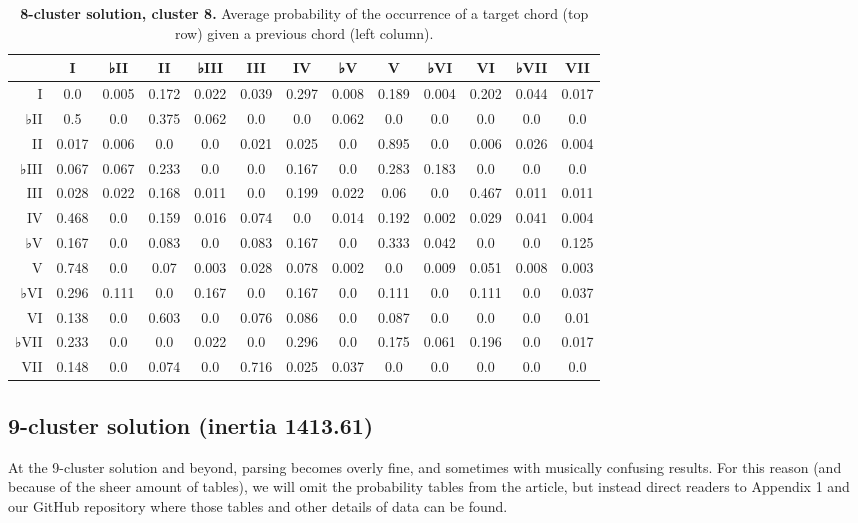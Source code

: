 \begin{table}[htbp]
\begin{minipage}{\linewidth}
\setlength{\tymax}{0.5\linewidth}
\centering
\small
\caption{\textbf{8-cluster solution, cluster 8.} Average probability of the occurrence of a target chord (top row) given a previous chord (left column).}
\label{8-clustersolutioncluster8.averageprobabilityoftheoccurrenceofatargetchordtoprowgivenapreviouschordleftcolumn.}
\begin{tabulary}{\textwidth}{@{}RCCCCCCCCCCCC@{}} \toprule
&I&♭II&II&♭III&III&IV&♭V&V&♭VI&VI&♭VII&VII\\
\midrule
I&0.0&0.005&0.172&0.022&0.039&0.297&0.008&0.189&0.004&0.202&0.044&0.017\\
♭II&0.5&0.0&0.375&0.062&0.0&0.0&0.062&0.0&0.0&0.0&0.0&0.0\\
II&0.017&0.006&0.0&0.0&0.021&0.025&0.0&0.895&0.0&0.006&0.026&0.004\\
♭III&0.067&0.067&0.233&0.0&0.0&0.167&0.0&0.283&0.183&0.0&0.0&0.0\\
III&0.028&0.022&0.168&0.011&0.0&0.199&0.022&0.06&0.0&0.467&0.011&0.011\\
IV&0.468&0.0&0.159&0.016&0.074&0.0&0.014&0.192&0.002&0.029&0.041&0.004\\
♭V&0.167&0.0&0.083&0.0&0.083&0.167&0.0&0.333&0.042&0.0&0.0&0.125\\
V&0.748&0.0&0.07&0.003&0.028&0.078&0.002&0.0&0.009&0.051&0.008&0.003\\
♭VI&0.296&0.111&0.0&0.167&0.0&0.167&0.0&0.111&0.0&0.111&0.0&0.037\\
VI&0.138&0.0&0.603&0.0&0.076&0.086&0.0&0.087&0.0&0.0&0.0&0.01\\
♭VII&0.233&0.0&0.0&0.022&0.0&0.296&0.0&0.175&0.061&0.196&0.0&0.017\\
VII&0.148&0.0&0.074&0.0&0.716&0.025&0.037&0.0&0.0&0.0&0.0&0.0\\

\bottomrule

\end{tabulary}
\end{minipage}
\end{table}

\subsection{9-cluster solution (inertia 1413.61)}
\label{9-clustersolutioninertia1413.61}

At the 9-cluster solution and beyond, parsing becomes overly fine, and sometimes with musically confusing results. For this reason (and because of the sheer amount of tables), we will omit the probability tables from the article, but instead direct readers to Appendix 1 and our GitHub repository where those tables and other details of data can be found.

